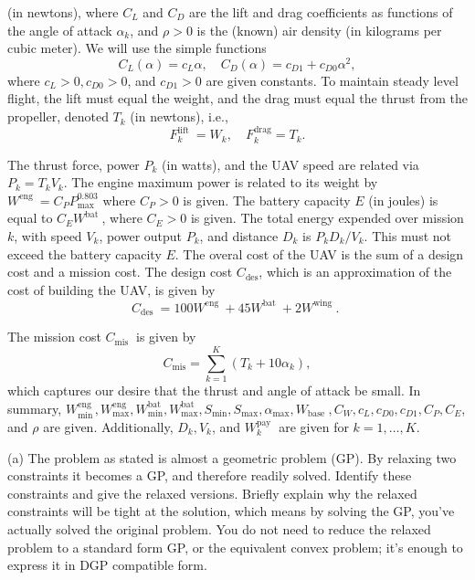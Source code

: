\documentclass[12pt,reqno]{article}
\theoremstyle{definition}
\numberwithin{equation}{section}
\begin{document}
    (in newtons), where $C_L$ and $C_D$ are the lift and drag coefficients as functions of the angle of attack $\alpha_k$, and $\rho>0$ is the (known) air density (in kilograms per cubic meter). We will use the simple functions
    \[
    C_L(\alpha)=c_L \alpha, \quad C_D(\alpha)=c_{D 1}+c_{D 0} \alpha^2,
    \]
    where $c_L>0, c_{D 0}>0$, and $c_{D 1}>0$ are given constants.
    To maintain steady level flight, the lift must equal the weight, and the drag must equal the thrust from the propeller, denoted $T_k$ (in newtons), i.e.,
    \[
    F_k^{\text {lift }}=W_k, \quad F_k^{\mathrm{drag}}=T_k .
    \]

    The thrust force, power $P_k$ (in watts), and the UAV speed are related via $P_k=T_k V_k$. The engine maximum power is related to its weight by $W^{\text {eng }}=C_P P_{\max }^{0.803}$ where $C_P>0$ is given.
    The battery capacity $E$ (in joules) is equal to $C_E W^{\text {bat }}$, where $C_E>0$ is given. The total energy expended over mission $k$, with speed $V_k$, power output $P_k$, and distance $D_k$ is $P_k D_k / V_k$. This must not exceed the battery capacity $E$.
    The overal cost of the UAV is the sum of a design cost and a mission cost. The design cost $C_{\mathrm{des}}$, which is an approximation of the cost of building the UAV, is given by
    \[
    C_{\text {des }}=100 W^{\text {eng }}+45 W^{\text {bat }}+2 W^{\text {wing }} \text {. }
    \]

    \noindent The mission cost $C_{\text {mis }}$ is given by
    \[
    C_{\mathrm{mis}}=\sum_{k=1}^K\left(T_k+10 \alpha_k\right),
    \]
    which captures our desire that the thrust and angle of attack be small.
    In summary, $W_{\min }^{\text {eng }}, W_{\max }^{\mathrm{eng}}, W_{\min }^{\mathrm{bat}}, W_{\max }^{\mathrm{bat}}, S_{\min }, S_{\max }, \alpha_{\max }, W_{\text {base }}, C_W, c_L, c_{D 0}, c_{D 1}, C_P, C_E$, and $\rho$ are given. Additionally, $D_k, V_k$, and $W_k^{\text {pay }}$ are given for $k=1, \ldots, K$.
    
    \vspace{0.1cm}
    \noindent(a) The problem as stated is almost a geometric problem (GP). By relaxing two constraints it becomes a GP,
    and therefore readily solved.
    Identify these constraints and give the relaxed versions. Briefly explain why the relaxed constraints will be tight at the solution,
    which means by solving the GP, you've actually solved the original problem.
    You do not need to reduce the relaxed problem to a standard form GP, or the equivalent convex problem; it's enough to express it in DGP compatible form.
    
\end{document}

